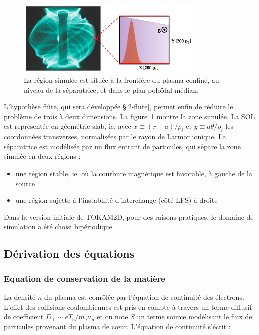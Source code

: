 \begin{refsection}
\begin{figure}[htbp]
\centering
    \includegraphics[width=0.8\textwidth]{figures/2-tokamSimDomain.png}
    \caption{La région simulée est située à la frontière du plasma confiné,
    au niveau de la séparatrice, et dans le plan poloïdal médian.}
    \label{2-figTokamGeom}
\end{figure}

L'hypothèse flûte, qui sera développée §\ref{2-flute}, permet enfin de réduire
le problème de trois à deux dimensions.
La figure~\ref{2-figTokamGeom} montre la zone simulée. La SOL est représentée
en géométrie slab, ie. avec $x\equiv(r-a)/\rho_i$ et $y\equiv
a\theta/\rho_i$ les coordonnées transverses, normalisées par le rayon de
Larmor ionique. La séparatrice est modélisée par un flux entrant de particules,
qui sépare la zone simulée en deux régions :

\begin{itemize}
  \item une région stable, ie. où la courbure magnétique est favorable, à gauche
  de la source
  \item une région sujette à l'instabilité d'interchange (côté LFS) à droite
 \end{itemize}
 
Dans la version initiale de TOKAM2D, pour des raisons pratiques, le domaine de
simulation a été choisi bipériodique. 

\subsection{Dérivation des équations}
\subsubsection{Equation de conservation de la matière}
La densité $n$ du plasma est conrôlée par l'équation de continuité des
électrons. L'effet des collisions coulombiennes est pris en compte à travers un
terme diffusif de coefficient $D_\perp\sim eT_\text{e}/m_\text{e}\nu_\text{ei}$
et on note $S$ un terme source modélisant le flux de particules
provenant du plasma de c\oe{}ur. L'équation de continuité s'écrit :


\end{refsection}
